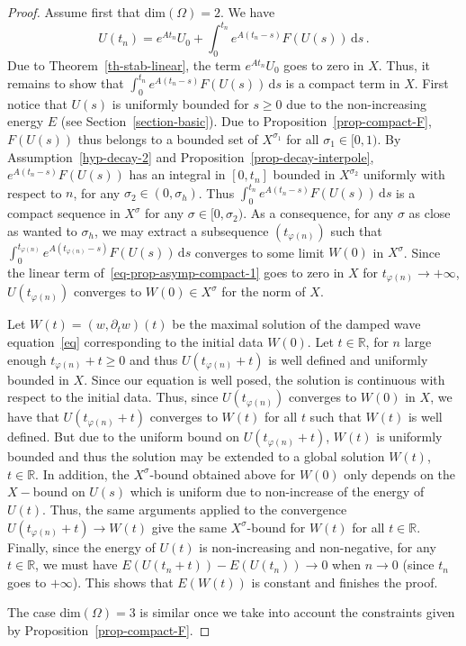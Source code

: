 \documentclass[AHL,Unicode,longabstracts]{cedram}
\newcommand{\RR}{\mathbb{R}}
\newcommand{\drm}{\mathrm{d}}
\begin{document}
\begin{proof}
Assume first that dim$(\Omega)=2$. We have
\begin{equation}\label{eq-prop-asymp-compact-1}
U(t_n)=e^{At_n}U_0 + \int_0^{t_n} e^{A(t_n-s)}F(U(s))\,\drm s\,.
\end{equation}
Due to Theorem~\ref{th-stab-linear}, the term $e^{At_n}U_0$ goes to zero in $X$. Thus, it remains to show that $\int_0^{t_n} e^{A(t_n-s)}F(U(s))\,\drm s$ is a compact term in $X$. First notice that $U(s)$ is uniformly bounded for $s\geq 0$ due to the non-increasing energy $E$ (see Section~\ref{section-basic}). Due to Proposition~\ref{prop-compact-F}, $F(U(s))$ thus belongs to a bounded set of $X^{\sigma_1}$ for all $\sigma_1\in [0,1)$. By Assumption~\eqref{hyp-decay-2} and Proposition~\ref{prop-decay-interpole}, $e^{A(t_n-s)}F(U(s))$ has an integral in $[0,t_n]$ bounded in $X^{\sigma_2}$ uniformly with respect to $n$, for any $\sigma_2 \in (0,\sigma_h)$. Thus $\int_0^{t_n} e^{A(t_n-s)}F(U(s))\,\drm s$ is a compact sequence in $X^\sigma$ for any $\sigma\in [0,\sigma_2)$. As a consequence, for any $\sigma$ as close as wanted to $\sigma_h$, we may extract a subsequence $(t_{\varphi(n)})$ such that $\int_0^{t_{\varphi(n)}} e^{A(t_{\varphi(n)}-s)}F(U(s))\,\drm s$ converges to some limit $W(0)$ in $X^\sigma$. Since the linear term of~\eqref{eq-prop-asymp-compact-1} goes to zero in $X$ for $t_{\varphi(n)}\rightarrow +\infty$, $U(t_{\varphi(n)})$ converges to $W(0)\in X^\sigma$ for the norm of $X$.

Let $W(t)=(w,\partial_t w)(t)$ be the maximal solution of the damped wave equation~\eqref{eq} corresponding to the initial data $W(0)$. Let $t\in\RR$, for $n$ large enough $t_{\varphi(n)}+t\geq 0$ and thus $U(t_{\varphi(n)}+t)$ is well defined and uniformly bounded in $X$. Since our equation is well posed, the solution is continuous with respect to the initial data. Thus, since $U(t_{\varphi(n)})$ converges to $W(0)$ in $X$, we have that $U(t_{\varphi(n)}+t)$ converges to $W(t)$ for all $t$ such that $W(t)$ is well defined. But due to the uniform bound on $U(t_{\varphi(n)}+t)$, $W(t)$ is uniformly bounded and thus the solution may be extended to a global solution $W(t)$, $t\in\RR$. In addition, the $X^\sigma$-bound obtained above for $W(0)$ only depends on the $X-$bound on $U(s)$ which is uniform due to non-increase of the energy of $U(t)$. Thus, the same arguments applied to the convergence $U(t_{\varphi(n)}+t)\rightarrow W(t)$ give the same $X^\sigma$-bound for $W(t)$ for all $t\in\RR$. Finally, since the energy of $U(t)$ is non-increasing and non-negative, for any $t\in\RR$, we must have $E(U(t_n+t))-E(U(t_n))\rightarrow 0$ when $n\rightarrow 0$ (since $t_n$ goes to $+\infty$). This shows that $E(W(t))$ is constant and finishes the proof.

The case dim$(\Omega)=3$ is similar once we take into account the constraints given by Proposition~\ref{prop-compact-F}.
\end{proof}
\end{document}
